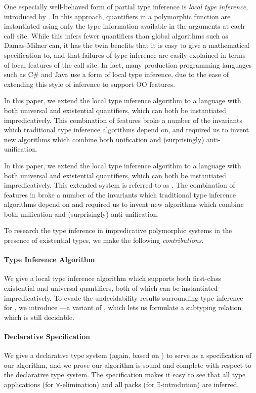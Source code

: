 One especially well-behaved form of partial type inference is \emph{local type
inference}, introduced by \citet{pierce2000:local}. In this approach,
quantifiers in a polymorphic function are instantiated using only the type
information available in the arguments at each call site. While this infers
fewer quantifiers than global algorithms such as Damas-Milner can, it has the
twin benefits that it is easy to give a mathematical specification to, and that
failures of type inference are easily explained in terms of local features of
the call site. In fact, many production programming languages such as C\# and
Java use a form of local type inference, due to the ease of extending this style
of inference to support OO features. 

In this paper, we extend the local type inference algorithm to a language with
both universal and existential quantifiers, which can both be instantiated
impredicatively. This combination of features broke a number of the invariants
which traditional type inference algorithms depend on, and required us to invent
new algorithms which combine both unification and (surprisingly)
anti-unification. 

In this paper, we extend the local type inference algorithm to a language with
both universal and existential quantifiers, which can both be instantiated
impredicatively. This extended system is referred to as \fexists. The
combination of features in \fexists  broke a number of the invariants which
traditional type inference algorithms depend on and required us to invent
new algorithms which combine both unification and (surprisingly)
anti-unification.

To research the type inference in impredicative polymorphic systems
in the presence of existential types, we make the following \emph{contributions}.

\paragraph{Type Inference Algorithm} We give a local type inference algorithm
    which supports both first-class existential and universal quantifiers, both
    of which can be instantiated impredicatively. To evade the undecidability
    results surrounding type inference for \systemf, we introduce \fexists---a
    variant of \CBPV \cite{levy2006:cbpv}, which lets us formulate a subtyping
    relation which is still decidable. 

\paragraph{Declarative Specification}
    We give a declarative type system (again, based on \CBPV) to
    serve as a specification of our algorithm, and we prove our algorithm is
    sound and complete with respect to the declarative type system. The
    specification makes it easy to see that all type applications (for
    $\forall$-elimination) and all packs (for $\exists$-introdution) are
    inferred. 

